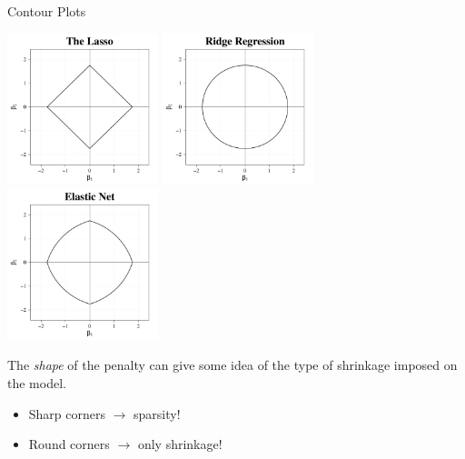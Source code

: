 \documentclass[8pt]{beamer}
\begin{document}
\begin{frame}{\color{white} Contour Plots}

\begin{center}
    \centering
    \includegraphics[width = 0.33\textwidth]{cont_lasso.pdf}
    \includegraphics[width = 0.33\textwidth]{cont_ridge.pdf}
    \includegraphics[width = 0.33\textwidth]{cont_enet.pdf}
\end{center}

The \textit{shape} of the penalty can give some idea of the type of shrinkage imposed on the model.
\begin{itemize}
    \item Sharp corners $\to$ sparsity! \Laughey[1.5][yellow][pink]
    \item Round corners $\to$ only shrinkage!
\end{itemize}
    
\end{frame}
\end{document}
